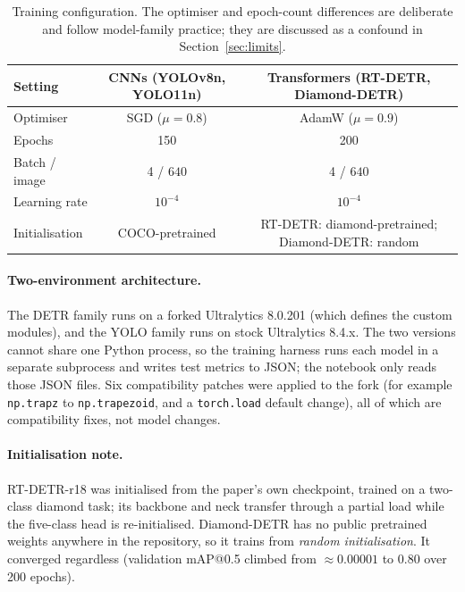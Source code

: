 \documentclass[11pt,a4paper]{article}
\begin{document}
\begin{table}[H]
\centering
\caption{Training configuration. The optimiser and epoch-count differences are deliberate and
follow model-family practice; they are discussed as a confound in Section~\ref{sec:limits}.}
\label{tab:setup}
\small
\begin{tabularx}{\textwidth}{l C C}
\toprule
\textbf{Setting} & \textbf{CNNs (YOLOv8n, YOLO11n)} & \textbf{Transformers (RT-DETR, Diamond-DETR)} \\
\midrule
Optimiser     & SGD ($\mu=0.8$)  & AdamW ($\mu=0.9$) \\
Epochs        & 150              & 200 \\
Batch / image & 4 / $640$        & 4 / $640$ \\
Learning rate & $10^{-4}$        & $10^{-4}$ \\
Initialisation& COCO-pretrained  & RT-DETR: diamond-pretrained; Diamond-DETR: random \\
\bottomrule
\end{tabularx}
\end{table}

\paragraph{Two-environment architecture.}
The DETR family runs on a forked Ultralytics 8.0.201 (which defines the custom modules), and the
YOLO family runs on stock Ultralytics 8.4.x. The two versions cannot share one Python process, so
the training harness runs each model in a separate subprocess and writes test metrics to JSON; the
notebook only reads those JSON files. Six compatibility patches were applied to the fork (for
example \texttt{np.trapz} to \texttt{np.trapezoid}, and a \texttt{torch.load} default change), all
of which are compatibility fixes, not model changes.

\paragraph{Initialisation note.}
RT-DETR-r18 was initialised from the paper's own checkpoint, trained on a two-class diamond task;
its backbone and neck transfer through a partial load while the five-class head is re-initialised.
Diamond-DETR has no public pretrained weights anywhere in the repository, so it trains from
\emph{random initialisation}. It converged regardless (validation mAP@0.5 climbed from
$\approx 0.00001$ to $0.80$ over 200 epochs).

\end{document}
